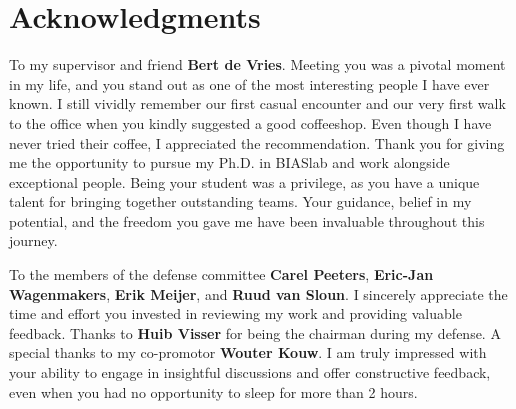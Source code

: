 
\chapter{Acknowledgments}

To my supervisor and friend \textbf{Bert de Vries}. 
Meeting you was a pivotal moment in my life, and you stand out as one of the most interesting people I have ever known. I still vividly remember our first casual encounter and our very first walk to the office when you kindly suggested a good coffeeshop. Even though I have never tried their coffee, I appreciated the recommendation. Thank you for giving me the opportunity to pursue my Ph.D. in BIASlab and work alongside exceptional people. Being your student was a privilege, as you have a unique talent for bringing together outstanding teams. 
Your guidance, belief in my potential, and the freedom you gave me have been invaluable throughout this journey.

To the members of the defense committee \textbf{Carel Peeters}, \textbf{Eric-Jan Wagenmakers}, \textbf{Erik Meijer}, and \textbf{Ruud van Sloun}. I sincerely appreciate the time and effort you invested in reviewing my work and providing valuable feedback. Thanks to \textbf{Huib Visser} for being the chairman during my defense. A special thanks to my co-promotor \textbf{Wouter Kouw}. I am truly impressed with your ability to engage in insightful discussions and offer constructive feedback, even when you had no opportunity to sleep for more than 2 hours.


